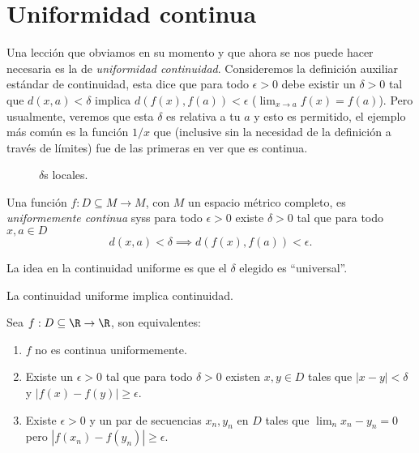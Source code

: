 \documentclass[11pt,oneside,a4paper]{book}
\begin{document}
\section{Uniformidad continua}
Una lección que obviamos en su momento y que ahora se nos puede hacer necesaria es la de \textit{uniformidad continuidad}. Consideremos la definición auxiliar estándar de continuidad, esta dice que para todo $\epsilon\gt 0$ debe existir un $\delta\gt 0$ tal que $d(x,a)\lt\delta$ implica $d(f(x),f(a))\lt\epsilon$ ($\lim_{x\to a}f(x)=f(a)$). Pero usualmente, veremos que esta $\delta$ es relativa a tu $a$ y esto es permitido, el ejemplo más común es la función $1/x$ que (inclusive sin la necesidad de la definición a través de límites) fue de las primeras en ver que es continua.
\begin{figure}
\centering
{}
\caption{$\delta$s locales.}
\end{figure}
\begin{mydef}
Una función $f:D\subseteq M\rightarrow M$, con $M$ un espacio métrico completo, es \textit{uniformemente continua} syss para todo $\epsilon\gt 0$ existe $\delta\gt 0$ tal que para todo $x,a\in D$
$$d(x,a)\lt\delta\implies d(f(x),f(a))\lt\epsilon.$$
\end{mydef}
La idea en la continuidad uniforme es que el $\delta$ elegido es ``universal''.
\begin{cor}
La continuidad uniforme implica continuidad.
\end{cor}
\begin{thm}
Sea $f:D\subseteq\R\rightarrow\R$, son equivalentes:
\begin{enumerate}[$a)$]
\item $f$ no es continua uniformemente.
\item Existe un $\epsilon\gt0$ tal que para todo $\delta\gt 0$ existen $x,y\in D$ tales que $|x-y|\lt\delta$ y $|f(x)-f(y)|\geq\epsilon$.
\item Existe $\epsilon\gt0$ y un par de secuencias $x_n,y_n$ en $D$ tales que $\lim_nx_n-y_n=0$ pero $|f(x_n)-f(y_n)|\geq\epsilon$.
\end{enumerate}
\end{thm}
\end{document}
